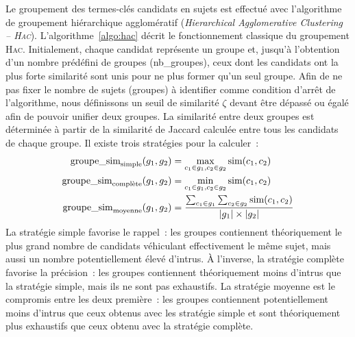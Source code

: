         Le groupement des termes-clés candidats en sujets est effectué avec
        l'algorithme de groupement hiérarchique agglomératif
        (\textit{Hierarchical Agglomerative Clustering -- \textsc{Hac}}).
        L'algorithme~\ref{algo:hac} décrit le fonctionnement classique du
        groupement \textsc{Hac}. Initialement, chaque candidat représente un
        groupe et, jusqu'à l'obtention d'un nombre prédéfini de groupes
        (nb\_groupes), ceux dont les candidats ont la plus forte similarité sont
        unis pour ne plus former qu'un seul groupe. Afin de ne pas fixer le
        nombre de sujets (groupes) à identifier comme condition d'arrêt de
        l'algorithme, nous définissons un seuil de similarité $\zeta$ devant
        être dépassé ou égalé afin de pouvoir unifier deux groupes. La
        similarité entre deux groupes est déterminée à partir de la similarité
        de Jaccard calculée entre tous les candidats de chaque groupe. Il existe
        trois stratégies pour la calculer~:
        \begin{align}
          \textnormal{groupe\_sim}_{\textnormal{simple}}(g_1, g_2) &= \max_{c_1 \in g_1, c_2 \in g_2} \textnormal{sim}(c_1, c_2)\\
          \textnormal{groupe\_sim}_{\textnormal{complète}}(g_1, g_2) &= \min_{c_1 \in g_1, c_2 \in g_2} \textnormal{sim}(c_1, c_2)\\
            \textnormal{groupe\_sim}_{\textnormal{moyenne}}(g_1, g_2) &= \frac{\sum_{c_1 \in g_1}\sum_{c_2 \in g_2} \textnormal{sim}(c_1, c_2)}{|g_1| \times |g_2|}
        \end{align}
        La stratégie simple favorise le rappel~: les groupes contiennent
        théoriquement le plus grand nombre de candidats véhiculant effectivement
        le même sujet, mais aussi un nombre potentiellement élevé d'intrus. À
        l'inverse, la stratégie complète favorise la précision~: les groupes
        contiennent théoriquement moins d'intrus que la stratégie simple, mais
        ils ne sont pas exhaustifs. La stratégie moyenne est le compromis entre
        les deux première~: les groupes contiennent potentiellement moins
        d'intrus que ceux obtenus avec les stratégie simple et sont
        théoriquement plus exhaustifs que ceux obtenu avec la stratégie
        complète.
